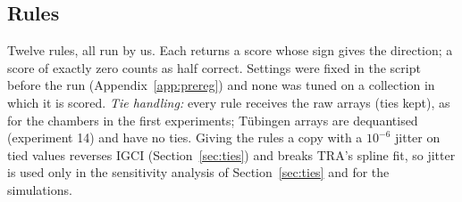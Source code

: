 \subsection{Rules}\label{sec:rules}
Twelve rules, all run by us. Each returns a score whose sign gives the direction; a score of exactly zero counts as half correct. Settings were fixed in the script before the run (Appendix~\ref{app:prereg}) and none was tuned on a collection in which it is scored. \emph{Tie handling:} every rule receives the raw arrays (ties kept), as for the chambers in the first experiments; T\"ubingen arrays are dequantised (experiment 14) and have no ties. Giving the rules a copy with a $10^{-6}$ jitter on tied values reverses IGCI (Section~\ref{sec:ties}) and breaks TRA's spline fit, so jitter is used only in the sensitivity analysis of Section~\ref{sec:ties} and for the simulations.
